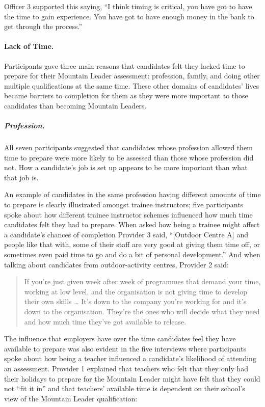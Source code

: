 \documentclass[
  12pt,
  a4paper,
]{book}
\begin{document}
Officer 3 supported this saying, ``I think timing is critical, you have got to have the time to gain experience. You have got to have enough money in the bank to get through the process.''

\hypertarget{qual-gta-lack-of-time}{%
\paragraph{Lack of Time.}\label{qual-gta-lack-of-time}}

Participants gave three main reasons that candidates felt they lacked time to prepare for their Mountain Leader assessment: profession, family, and doing other multiple qualifications at the same time. These other domains of candidates' lives became barriers to completion for them as they were more important to those candidates than becoming Mountain Leaders.

\hypertarget{qual-gta-lack-time-profession}{%
\subparagraph{Profession.}\label{qual-gta-lack-time-profession}}

All seven participants suggested that candidates whose profession allowed them time to prepare were more likely to be assessed than those whose profession did not. How a candidate's job is set up appears to be more important than what that job is.

An example of candidates in the same profession having different amounts of time to prepare is clearly illustrated amongst trainee instructors; five participants spoke about how different trainee instructor schemes influenced how much time candidates felt they had to prepare. When asked how being a trainee might affect a candidate's chances of completion Provider 3 said, ``{[}Outdoor Centre A{]} and people like that with, some of their staff are very good at giving them time off, or sometimes even paid time to go and do a bit of personal development.'' And when talking about candidates from outdoor-activity centres, Provider 2 said:

\begin{quote}
If you're just given week after week of programmes that demand your time, working at low level, and the organisation is not giving time to develop their own skills \ldots{} It's down to the company you're working for and it's down to the organisation. They're the ones who will decide what they need and how much time they've got available to release.
\end{quote}

The influence that employers have over the time candidates feel they have available to prepare was also evident in the five interviews where participants spoke about how being a teacher influenced a candidate's likelihood of attending an assessment. Provider 1 explained that teachers who felt that they only had their holidays to prepare for the Mountain Leader might have felt that they could not ``fit it in'' and that teachers' available time is dependent on their school's view of the Mountain Leader qualification:
\end{document}
